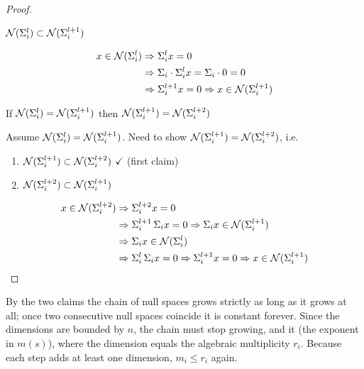 \begin{proof}
\begin{claim}
$\mathcal{N}(\Sigma_i^l)\subset\mathcal{N}(\Sigma_i^{l+1})$
\end{claim}
\begin{minipage}{0.3\textwidth}
\centering
{}
\end{minipage}\hfill
\begin{minipage}{0.65\textwidth}
\begin{align*}
x\in\mathcal{N}(\Sigma_i^l)&\Rightarrow \Sigma_i^lx=0\\
&\Rightarrow \Sigma_i\cdot\Sigma_i^lx=\Sigma_i\cdot 0=0\\
&\Rightarrow \Sigma_i^{l+1}x=0\Rightarrow x\in\mathcal{N}(\Sigma_i^{l+1})
\end{align*}
\end{minipage}

\begin{claim}
If $\mathcal{N}(\Sigma_i^l)=\mathcal{N}(\Sigma_i^{l+1})$ then $\mathcal{N}(\Sigma_i^{l+1})=\mathcal{N}(\Sigma_i^{l+2})$
\end{claim}
Assume $\mathcal{N}(\Sigma_i^l)=\mathcal{N}(\Sigma_i^{l+1})$. Need to show $\mathcal{N}(\Sigma_i^{l+1})=\mathcal{N}(\Sigma_i^{l+2})$, i.e.
\begin{enumerate}[label=(\roman*),itemsep=2pt,topsep=2pt]
\item $\mathcal{N}(\Sigma_i^{l+1})\subset\mathcal{N}(\Sigma_i^{l+2})$ \quad $\checkmark$ (first claim)
\item $\mathcal{N}(\Sigma_i^{l+2})\subset\mathcal{N}(\Sigma_i^{l+1})$
\end{enumerate}
\begin{align*}
x\in\mathcal{N}(\Sigma_i^{l+2})&\Rightarrow\Sigma_i^{l+2}x=0\\
&\Rightarrow \Sigma_i^{l+1}\,\Sigma_ix=0\Rightarrow\Sigma_ix\in\mathcal{N}(\Sigma_i^{l+1})\\
&\Rightarrow\Sigma_ix\in\mathcal{N}(\Sigma_i^l)\\
&\Rightarrow \Sigma_i^l\,\Sigma_ix=0\Rightarrow\Sigma_i^{l+1}x=0\Rightarrow x\in\mathcal{N}(\Sigma_i^{l+1}) \qedhere
\end{align*}
\end{proof}
\begin{insight}[Consequence]
By the two claims the chain of null spaces grows strictly as long as it grows at all; once two consecutive null spaces coincide it is constant forever. Since the dimensions are bounded by $n$, the chain must stop growing, and it  (the exponent in $m(s)$), where the dimension equals the algebraic multiplicity $r_i$. Because each step adds at least one dimension, $m_i\le r_i$ again.
\end{insight}

